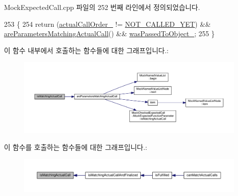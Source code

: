 Mock\+Expected\+Call.\+cpp 파일의 252 번째 라인에서 정의되었습니다.


\begin{DoxyCode}
253 \{
254     \textcolor{keywordflow}{return} (\hyperlink{class_mock_checked_expected_call_a58e873078e053e6b06ad68a8a7e0c313}{actualCallOrder\_} != \hyperlink{class_mock_checked_expected_call_a25e50be5c73e0b2fab54944e68dd48c2a3ab9ca78a7007329301ba4cfb64310a7}{NOT\_CALLED\_YET}) && 
      \hyperlink{class_mock_checked_expected_call_a01fdc26233d1f10da9271532b33673ee}{areParametersMatchingActualCall}() && 
      \hyperlink{class_mock_checked_expected_call_acf314d631f3d1c061a194a72dba26ea1}{wasPassedToObject\_};
255 \}
\end{DoxyCode}


이 함수 내부에서 호출하는 함수들에 대한 그래프입니다.\+:
\nopagebreak
\begin{figure}[H]
\begin{center}
\leavevmode
\includegraphics[width=350pt]{class_mock_checked_expected_call_ac059128483bd37343d9d487617b0e9af_cgraph}
\end{center}
\end{figure}




이 함수를 호출하는 함수들에 대한 그래프입니다.\+:
\nopagebreak
\begin{figure}[H]
\begin{center}
\leavevmode
\includegraphics[width=350pt]{class_mock_checked_expected_call_ac059128483bd37343d9d487617b0e9af_icgraph}
\end{center}
\end{figure}


